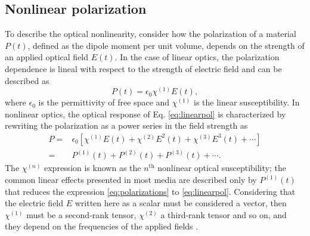 \subsection{Nonlinear polarization}
\label{sec:nonlinear_polarization}

To describe the optical nonlinearity, consider how the polarization of a
material $P (t)$, defined as the dipole moment per unit volume, depends on the
strength of an applied optical field $E (t)$. In the case of linear optics, the
polarization dependence is lineal with respect to the strength of electric
field and can be described as
\begin{equation}
P (t) = \epsilon_{0} \chi^{(1)} E (t),
\label{eq:linearpol}
\end{equation}
where $\epsilon_{0}$ is the permittivity of free space and $\chi^{(1)}$ is the
linear susceptibility. In nonlinear optics, the optical response of Eq.
\eqref{eq:linearpol} is characterized by rewriting the polarization as a power
series in the field strength as 
\begin{equation}
\begin{aligned}
P 
=& 
\epsilon_{0} [ \chi^{(1)} E (t) + \chi^{(2)} E^{2} (t) + \chi^{(3)}
E^{3} (t) + \cdots ]
\\
=&
P^{(1)} (t) + P^{(2)} (t) + P^{(3)}
(t) + \cdots
.
\label{eq:polarizations}
\end{aligned}
\end{equation}
The $\chi^{(n)}$ expression is known as the $n^{\text{th}}$ nonlinear optical
susceptibility; the common linear effects presented in most media are described
only by $P^{(1)} (t)$ that reduces the expression \eqref{eq:polarizations} to
\eqref{eq:linearpol}. Considering that the electric field $E$ written here as a
scalar must be considered a vector, then $\chi^{(1)}$ must be a second-rank
tensor, $\chi^{(2)}$ a third-rank tensor and so on, and they depend on the
frequencies of the applied fields \cite{boyd03nonlinear}.

